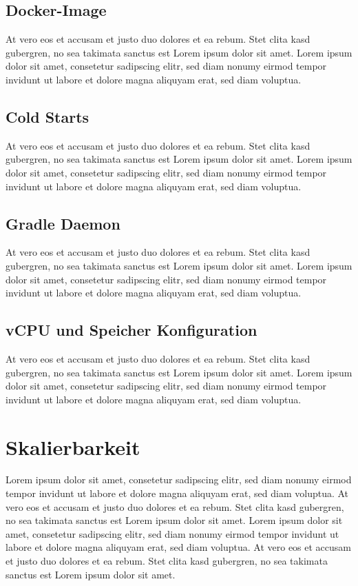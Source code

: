 \subsection{Docker-Image}
At vero eos et accusam et justo duo dolores et ea rebum. Stet clita kasd gubergren,
no sea takimata sanctus est Lorem ipsum dolor sit amet. Lorem ipsum dolor sit amet,
consetetur sadipscing elitr, sed diam nonumy eirmod tempor invidunt ut labore et
dolore magna aliquyam erat, sed diam voluptua.
\subsection{Cold Starts}
At vero eos et accusam et justo duo dolores et ea rebum. Stet clita kasd gubergren,
no sea takimata sanctus est Lorem ipsum dolor sit amet. Lorem ipsum dolor sit amet,
consetetur sadipscing elitr, sed diam nonumy eirmod tempor invidunt ut labore et
dolore magna aliquyam erat, sed diam voluptua.
\subsection{Gradle Daemon}
At vero eos et accusam et justo duo dolores et ea rebum. Stet clita kasd gubergren,
no sea takimata sanctus est Lorem ipsum dolor sit amet. Lorem ipsum dolor sit amet,
consetetur sadipscing elitr, sed diam nonumy eirmod tempor invidunt ut labore et
dolore magna aliquyam erat, sed diam voluptua.
\subsection{vCPU und Speicher Konfiguration}
At vero eos et accusam et justo duo dolores et ea rebum. Stet clita kasd gubergren,
no sea takimata sanctus est Lorem ipsum dolor sit amet. Lorem ipsum dolor sit amet,
consetetur sadipscing elitr, sed diam nonumy eirmod tempor invidunt ut labore et
dolore magna aliquyam erat, sed diam voluptua.

\section{Skalierbarkeit}
Lorem ipsum dolor sit amet, consetetur sadipscing elitr,
sed diam nonumy eirmod tempor invidunt ut labore et dolore magna
aliquyam erat, sed diam voluptua.
At vero eos et accusam et justo duo dolores et ea rebum. Stet clita kasd gubergren,
no sea takimata sanctus est Lorem ipsum dolor sit amet. Lorem ipsum dolor sit amet,
consetetur sadipscing elitr, sed diam nonumy eirmod tempor invidunt ut labore et
dolore magna aliquyam erat, sed diam voluptua.
At vero eos et accusam et justo duo dolores et ea rebum.
Stet clita kasd gubergren, no sea takimata sanctus est Lorem ipsum dolor sit amet.
